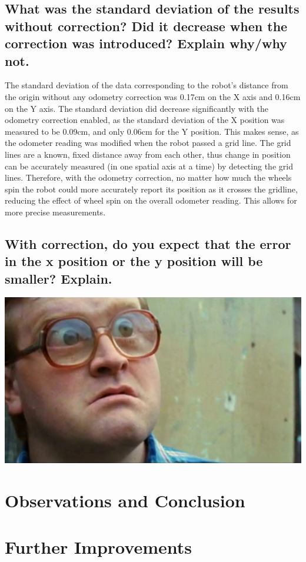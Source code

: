 \documentclass[11pt]{article} %
\begin{document}
\subsection{What was the standard deviation of the results without correction? Did it decrease when
the correction was introduced? Explain why/why not.}
The standard deviation of the data corresponding to the robot's distance from the origin without any
odometry correction was 0.17cm on the X axis and 0.16cm on the Y axis. The standard deviation did
decrease significantly with the odometry correction enabled, as the standard deviation of the X
position was measured to be 0.09cm, and only 0.06cm for the Y position. This makes sense, as the
odometer reading was modified when the robot passed a grid line. The grid lines are a known, fixed
distance away from each other, thus change in position can be accurately measured (in one spatial
axis at a time) by detecting the grid lines. Therefore, with the odometry correction, no matter how
much the wheels spin the robot could more accurately report its position as it crosses the gridline,
reducing the effect of wheel spin on the overall odometer reading. This allows for more precise
measurements.
\subsection{With correction, do you expect that the error in the x position or the y position will
be smaller? Explain.}
\includegraphics{Bubbles.png}
\section{Observations and Conclusion}

\section{Further Improvements}
\end{document}
